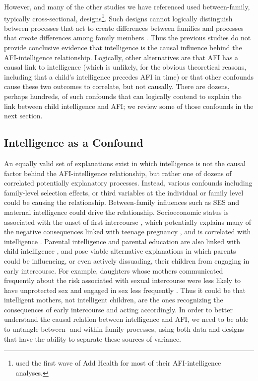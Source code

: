 However, \citet{halpern2000smart} and many of the other studies we have referenced \citep[e.g.,][]{mathews2009predictors,miller1997timing,Paul2000} used between-family, typically cross-sectional, designs\footnote{\citet{halpern2000smart} used the first wave of Add Health for most of their AFI-intelligence analyses.}. Such designs cannot logically distinguish between processes that act to create differences between families and processes that create differences among family members \citep{Lahey2010,Rodgers2000}. Thus the previous studies do not provide conclusive evidence that intelligence is the causal influence behind the AFI-intelligence relationship. Logically, other alternatives are that AFI has a causal link to intelligence (which is unlikely, for the obvious theoretical reasons, including that a child's intelligence precedes AFI in time) or that other confounds cause these two outcomes to correlate, but not causally. There are dozens, perhaps hundreds, of such confounds that can logically contend to explain the link between child intelligence and AFI; we review some of those confounds in the next section.
%
\subsection{Intelligence as a Confound}
An equally valid set of explanations exist in which intelligence is not the causal factor behind the AFI-intelligence relationship, but rather one of dozens of correlated potentially explanatory processes. Instead, various confounds including family-level selection effects, or third variables at the individual or family level could be causing the relationship. Between-family influences such as SES and maternal intelligence could drive the relationship. Socioeconomic status is associated with the onset of first intercourse \citep{Lammers2000}, which potentially explains many of the negative consequences linked with teenage pregnancy \citep{geronimus1992socioeconomic}, and is correlated with intelligence \citep{murray1998income,Neisser1996,Strenze2007}. Parental intelligence and parental education are also linked with child intelligence \citep{Bouchard2004,devlin1997heritability,mercy1982familial}, and pose viable alternative explanations in which parents could be influencing, or even actively  dissuading, their children from engaging in early intercourse. For example, daughters whose mothers communicated frequently about the risk associated with sexual intercourse were less likely to have unprotected sex and engaged in sex less frequently \citep{hutchinson2003role}. Thus it could be that intelligent mothers, not intelligent children, are the ones recognizing the consequences of early intercourse and acting accordingly. In order to better understand the causal relation between intelligence and AFI, we need to be able to untangle between- and within-family processes, using both data and designs that have the ability to separate these sources of variance.

